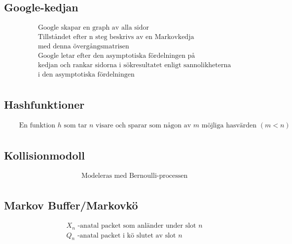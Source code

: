 \subsection{Google-kedjan}
\begin{align*}
  &\quad  \text{Google skapar en graph av alla sidor} \\
  &\quad  \text{Tillståndet efter n steg beskrivs av en Markovkedja} \\
  &\quad  \text{med denna övergångsmatrisen} \\
  &\quad  \text{Google letar efter den asymptotiska fördelningen på } \\
  &\quad  \text{kedjan och rankar sidorna i sökresultatet enligt sannolikheterna} \\
  &\quad  \text{i den asymptotiska fördelningen} \\
\end{align*}

\subsection{Hashfunktioner}
\begin{align*}
  &\quad  \text{En funktion $h$ som tar $n$ visare och sparar som någon av $m$ möjliga hasvärden $(m<n)$} \\
\end{align*}

\subsection{Kollisionmodoll}
\begin{align*}
  &\quad  \text{Modeleras med Bernoulli-processen} \\
\end{align*}

\subsection{Markov Buffer/Markovkö}
\begin{align*}
  &\quad  \text{$X_n$ -anatal packet som anländer under slot $n$} \\
  &\quad  \text{$Q_n$ -anatal packet i kö slutet av slot $n$} \\
\end{align*}


